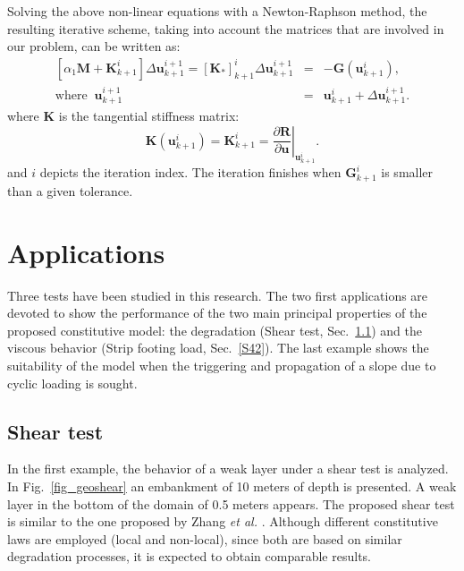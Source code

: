 \documentclass[applsci,journal,article,submit,moreauthors,pdftex]{Definitions/mdpi}
\begin{document}
Solving the above non-linear equations with a Newton-Raphson method, the resulting iterative scheme, taking into account the matrices that are involved in our problem, can be written as:
\begin{eqnarray}\label{eq_uw32}
\left[\alpha_1\boldsymbol {M}+\boldsymbol {K}^{i}_{k+1}\right]\Delta\boldsymbol{u}^{i+1}_{k+1} = \left[\boldsymbol {K_{*}}\right]^{i}_{k+1} \Delta\boldsymbol{u}^{i+1}_{k+1} &=& -\boldsymbol {G}(\boldsymbol {u}^{i}_{k+1}), \\
\mbox{where}\;\; \boldsymbol {u}^{i+1}_{k+1} &=& \boldsymbol {u}^{i}_{k+1} + \Delta \boldsymbol {u}^{i+1}_{k+1}.  \nonumber 
\end{eqnarray}
where $\boldsymbol {K}$ is the tangential stiffness matrix:
\begin{equation}\label{eq_uw31}
\boldsymbol {K}(\boldsymbol {u}^{i}_{k+1})=\boldsymbol {K}^{i}_{k+1}=\left.\frac{\partial\boldsymbol {R}}{\partial \boldsymbol {u}}\right|_{\boldsymbol{u}^{i}_{k+1}}.
\end{equation}
and $i$ depicts the iteration index. The iteration finishes when  $\boldsymbol {G}^{i}_{k+1}$ is smaller than a given tolerance.

\section{Applications}
\label{S4}
Three tests have been studied in this research. The two first applications are devoted to show the performance of the two main principal properties of the proposed constitutive model: the degradation (Shear test, Sec.~\ref{S41}) and the viscous behavior (Strip footing load, Sec.~\ref{S42}). The last example shows the suitability of the model when the triggering and propagation of a slope due to cyclic loading is sought.

\subsection{Shear test}
\label{S41}
In the first example, the behavior of a weak layer under a shear test is analyzed. In Fig.~\ref{fig_geoshear} an embankment of 10 meters of depth is presented. A weak layer in the bottom of the domain of 0.5 meters appears. The proposed shear test is similar to the one proposed by Zhang \textit{et al.} \cite{Zhang2015}. Although different constitutive laws are employed (local and non-local), since both are based on similar degradation processes, it is expected to obtain comparable results.
\end{document}
